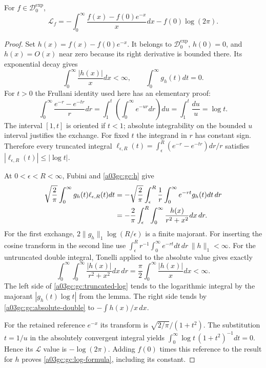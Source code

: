\begin{theorem}
For $f\in\mathcal D_0^{\exp}$,
\begin{equation}
 \boxed{\displaystyle
 \mathscr L_f=-\int_0^\infty\frac{f(x)-f(0)e^{-x}}{x}dx
                      -f(0)\log(2\pi).}
 \label{a03gc:gc:log-formula}
\end{equation}
\end{theorem}
\begin{proof}
Set $h(x)=f(x)-f(0)e^{-x}$.  It belongs to $\mathcal D_0^{\exp}$,
$h(0)=0$, and $h(x)=O(x)$ near zero because its right derivative is
bounded there.  Its exponential decay gives
\begin{equation}
 \int_0^\infty\frac{|h(x)|}{x}dx<\infty,
 \qquad \int_0^\infty g_h(t)dt=0.
 \label{a03gc:gc:h}
\end{equation}
For $t>0$ the Frullani identity used here has an elementary proof:
\begin{equation}
 \int_0^\infty\frac{e^{-r}-e^{-tr}}{r}dr
 =\int_1^t\left(\int_0^\infty e^{-ur}dr\right)du
 =\int_1^t\frac{du}{u}=\log t.
 \label{a03gc:gc:Frullani}
\end{equation}
The interval $[1,t]$ is oriented if $t<1$; absolute integrability on the
bounded $u$ interval justifies the exchange.  For fixed $t$ the integrand
in $r$ has constant sign.  Therefore every truncated integral
$\ell_{\epsilon,R}(t)=\int_\epsilon^R(e^{-r}-e^{-tr})dr/r$
satisfies $|\ell_{\epsilon,R}(t)|\le|\log t|$.

At $0<\epsilon<R<\infty$, Fubini and \eqref{a03gc:gc:h} give
\begin{align}
 \sqrt{\frac2\pi}\int_0^\infty g_h(t)\ell_{\epsilon,R}(t)dt
 &=-\sqrt{\frac2\pi}\int_\epsilon^R\frac1r
                        \int_0^\infty e^{-rt}g_h(t)dt\,dr\notag\\
 &=-\frac2\pi\int_\epsilon^R\int_0^\infty
                           \frac{h(x)}{r^2+x^2}dx\,dr.
 \label{a03gc:gc:truncated-log}
\end{align}
For the first exchange, $2\|g_h\|_1\log(R/\epsilon)$ is a finite
majorant.  For inserting the cosine transform in the second line use
$\int_\epsilon^R r^{-1}\int_0^\infty e^{-rt}dt\,dr\,\|h\|_1<\infty$.
For the untruncated double integral, Tonelli applied to the absolute value
gives exactly
\begin{equation}
 \int_0^\infty\int_0^\infty\frac{|h(x)|}{r^2+x^2}dx\,dr
   =\frac\pi2\int_0^\infty\frac{|h(x)|}{x}dx<\infty.
 \label{a03gc:gc:absolute-double}
\end{equation}
The left side of \eqref{a03gc:gc:truncated-log} tends to the logarithmic
integral by the majorant $|g_h(t)\log t|$ from the lemma.  The right side
tends by \eqref{a03gc:gc:absolute-double} to $-\int h(x)/x\,dx$.

For the retained reference $e^{-x}$ its transform is
$\sqrt{2/\pi}/(1+t^2)$.  The substitution $t=1/u$ in the absolutely
convergent integral yields
$\int_0^\infty\log t\,(1+t^2)^{-1}dt=0$.
Hence its $\mathscr L$ value is $-\log(2\pi)$.
Adding $f(0)$ times this reference to the result for $h$ proves
\eqref{a03gc:gc:log-formula}, including its constant.
\end{proof}

